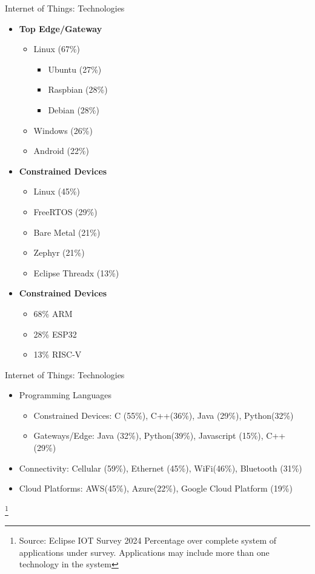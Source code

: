 \begin{frame}{Internet of Things: Technologies}
  \begin{itemize}
    \item \textbf{Top Edge/Gateway}
    \begin{itemize}
      \item Linux (67\%)
      \begin{itemize}
        \item Ubuntu (27\%)
        \item Raspbian (28\%)
        \item Debian (28\%)
      \end{itemize}
      \item Windows (26\%)
      \item Android (22\%)
    \end{itemize}
    \item \textbf{Constrained Devices}
    \begin{itemize}
      \item Linux (45\%)
      \item FreeRTOS (29\%)
      \item Bare Metal (21\%)
      \item Zephyr (21\%)
      \item Eclipse Threadx (13\%)
    \end{itemize}
    \item \textbf{Constrained Devices}
    \begin{itemize}
      \item 68\% ARM
      \item 28\% ESP32
      \item 13\% RISC-V
    \end{itemize}
  \end{itemize}

\end{frame}

\begin{frame}{Internet of Things: Technologies}
    \begin{itemize}
        \item Programming Languages 
        \begin{itemize}
            \item Constrained Devices: C (55\%), C++(36\%), Java (29\%), Python(32\%)
            \item Gateways/Edge: Java (32\%), Python(39\%), Javascript (15\%), C++ (29\%)
        \end{itemize}
        \item Connectivity: Cellular (59\%), Ethernet (45\%), WiFi(46\%), Bluetooth (31\%)
        \item Cloud Platforms: AWS(45\%), Azure(22\%), Google Cloud Platform (19\%)
    \end{itemize}
    \footnote{Source: Eclipse IOT Survey 2024 Percentage over complete system of applications under survey. Applications may include more than one technology in the system}
\end{frame}

